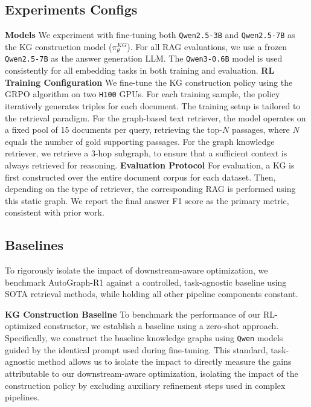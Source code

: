 \documentclass[11pt]{article}
\begin{document}
\subsection{Experiments Configs}
\label{sec:exp_config}
\textbf{Models} We experiment with fine-tuning both \texttt{Qwen2.5-3B} and \texttt{Qwen2.5-7B} \citep{qwen_qwen25_2025} as the KG construction model ($\pi_{\theta}^{KG}$). For all RAG evaluations, we use a frozen \texttt{Qwen2.5-7B} as the answer generation LLM. The \texttt{Qwen3-0.6B} model is used consistently for all embedding tasks in both training and evaluation.
\textbf{RL Training Configuration} We fine-tune the KG construction policy using the GRPO algorithm \citep{shao_deepseekmath_2024} on two \texttt{H100} GPUs. For each training sample, the policy iteratively generates triples for each document. The training setup is tailored to the retrieval paradigm. For the graph-based text retriever, the model operates on a fixed pool of 15 documents per query, retrieving the top-$N$ passages, where $N$ equals the number of gold supporting passages. For the graph knowledge retriever, we retrieve a 3-hop subgraph, to ensure that a sufficient context is always retrieved for reasoning.
\textbf{Evaluation Protocol} For evaluation, a KG is first constructed over the entire document corpus for each dataset. Then, depending on the type of retriever, the corresponding RAG is performed using this static graph. We report the final answer F1 score as the primary metric, consistent with prior work.

\subsection{Baselines}
To rigorously isolate the impact of downstream-aware optimization, we benchmark AutoGraph-R1 against a controlled, task-agnostic baseline using SOTA retrieval methods, while holding all other pipeline components constant.

\textbf{KG Construction Baseline} To benchmark the performance of our RL-optimized constructor, we establish a baseline using a zero-shot approach. Specifically, we construct the baseline knowledge graphs using \texttt{Qwen} models guided by the identical prompt used during fine-tuning. This standard, task-agnostic method allows us to isolate the impact to directly measure the gains attributable to our downstream-aware optimization, isolating the impact of the construction policy by excluding auxiliary refinement steps used in complex pipelines.
\end{document}
